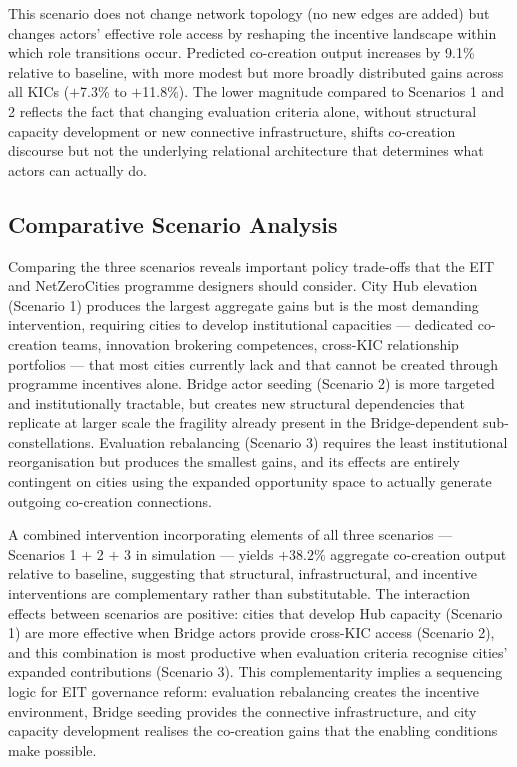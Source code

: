 \documentclass[review,12pt]{elsarticle}
\begin{document}
This scenario does not change network topology (no new edges are added) but changes actors' effective role access by reshaping the incentive landscape within which role transitions occur. Predicted co-creation output increases by 9.1\% relative to baseline, with more modest but more broadly distributed gains across all KICs ($+$7.3\% to $+$11.8\%). The lower magnitude compared to Scenarios 1 and 2 reflects the fact that changing evaluation criteria alone, without structural capacity development or new connective infrastructure, shifts co-creation discourse but not the underlying relational architecture that determines what actors can actually do.

\subsection{Comparative Scenario Analysis}

Comparing the three scenarios reveals important policy trade-offs that the EIT and NetZeroCities programme designers should consider. City Hub elevation (Scenario 1) produces the largest aggregate gains but is the most demanding intervention, requiring cities to develop institutional capacities --- dedicated co-creation teams, innovation brokering competences, cross-KIC relationship portfolios --- that most cities currently lack and that cannot be created through programme incentives alone. Bridge actor seeding (Scenario 2) is more targeted and institutionally tractable, but creates new structural dependencies that replicate at larger scale the fragility already present in the Bridge-dependent sub-constellations. Evaluation rebalancing (Scenario 3) requires the least institutional reorganisation but produces the smallest gains, and its effects are entirely contingent on cities using the expanded opportunity space to actually generate outgoing co-creation connections.

A combined intervention incorporating elements of all three scenarios --- Scenarios 1 $+$ 2 $+$ 3 in simulation --- yields $+38.2\%$ aggregate co-creation output relative to baseline, suggesting that structural, infrastructural, and incentive interventions are complementary rather than substitutable. The interaction effects between scenarios are positive: cities that develop Hub capacity (Scenario 1) are more effective when Bridge actors provide cross-KIC access (Scenario 2), and this combination is most productive when evaluation criteria recognise cities' expanded contributions (Scenario 3). This complementarity implies a sequencing logic for EIT governance reform: evaluation rebalancing creates the incentive environment, Bridge seeding provides the connective infrastructure, and city capacity development realises the co-creation gains that the enabling conditions make possible.
\end{document}
